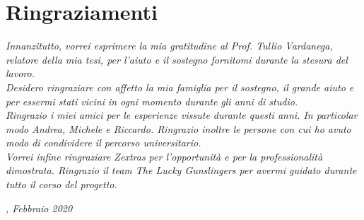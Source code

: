
\cleardoublepage
{}
{}

\bigskip

\begingroup
\let\clearpage\relax
\let\cleardoublepage\relax
\let\cleardoublepage\relax

\chapter*{Ringraziamenti}

\noindent \textit{Innanzitutto, vorrei esprimere la mia gratitudine al Prof. Tullio Vardanega, relatore della mia tesi, per l'aiuto e il sostegno fornitomi durante la stesura del lavoro.}\\

\noindent \textit{Desidero ringraziare con affetto la mia famiglia per il sostegno, il grande aiuto e per essermi stati vicini in ogni momento durante gli anni di studio.}\\

\noindent \textit{Ringrazio i miei amici per le esperienze vissute durante questi anni. In particolar modo Andrea, Michele e Riccardo. Ringrazio inoltre le persone con cui ho avuto modo di condividere il percorso universitario.}\\

\noindent \textit{Vorrei infine ringraziare Zextras per l'opportunità e per la professionalità dimostrata. Ringrazio il team The Lucky Gunslingers per avermi guidato durante tutto il corso del progetto.}\\

\bigskip

\noindent\textit{\myLocation, Febbraio 2020}
\hfill \myName

\endgroup

